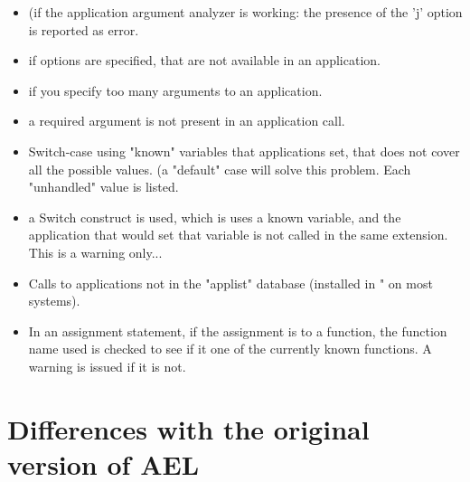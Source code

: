 {\begin{itemize}
    \item (if the application argument analyzer is working: the presence
      of the 'j' option is reported as error.
    \item if options are specified, that are not available in an
      application.
    \item if you specify too many arguments to an application.
    \item a required argument is not present in an application call.
    \item Switch-case using "known" variables that applications set, that
      does not cover all the possible values. (a "default" case will
      solve this problem. Each "unhandled" value is listed.
    \item a Switch construct is used, which is uses a known variable, and
      the application that would set that variable is not called in
      the same extension. This is a warning only...
    \item Calls to applications not in the "applist" database (installed
      in " on most systems).
    \item In an assignment statement, if the assignment is to a function,
      the function name used is checked to see if it one of the
      currently known functions. A warning is issued if it is not.
\end{itemize}

\section{Differences with the original version of AEL}

}
